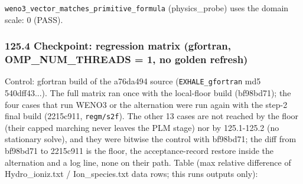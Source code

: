 \documentclass[english,a4paper]{my_memo}
\begin{document}
\texttt{weno3\_vector\_matches\_primitive\_formula} (physics\_probe) uses the domain scale: 0 (PASS).

\subsubsection{125.4 Checkpoint: regression matrix (gfortran, OMP\_NUM\_THREADS = 1, no golden refresh)}\label{1254-checkpoint-regression-matrix-gfortran-omp_num_threads--1-no-golden-refresh}

Control: gfortran build of the a76da494 source (\texttt{EXHALE\_gfortran} md5 540dff43...). The full matrix ran once with the local-floor build (bf98bd71); the four cases that run WENO3 or the alternation were run again with the step-2 final build (2215c911, \texttt{regm/s2f}). The other 13 cases are not reached by the floor (their capped marching never leaves the PLM stage) nor by 125.1-125.2 (no stationary solve), and they were bitwise the control with bf98bd71; the diff from bf98bd71 to 2215c911 is the floor, the acceptance-record restore inside the alternation and a log line, none on their path. Table (max relative difference of Hydro\_ioniz.txt / Ion\_species.txt data rows; this run\textquotesingle s outputs only):
\end{document}
